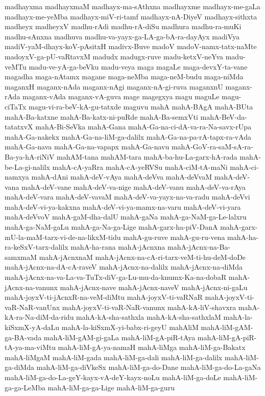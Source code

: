 {madhayxma
madhayxmaM
madhayx-ma-sAthxna
madhayxme
madhayx-me-gaLa
madhayx-me-yeMba
madhayx-miV-ri-tamf
madhayx-nA-DiyeV
madhayx-sithxta
madheyx
madheyxV
madhu-rAdi
madhu-rA-diSu
madhura
madhu-ra-muKi
madhu-sAnxna
madhuva
madhu-va-yayx-ga-LA-ga-bA-ra-dayAyx
madiVya
madiV-yaM-dhayx-koV-pAsitxH
madivx-Buve
madoV
madoV-namx-tatx-naMte
madoyxV-ga-pU-vaRtavxM
madudx
madugx-ruve
madu-ketxV-neYva
madu-veMTu
madu-ve-yA-ga-beVku
madu-veya
maga
magaLe
maga-devxY-ta-vane
magadha
maga-nAtamx
magane
maga-neMba
maga-neM-budu
maga-niMda
maganxH
maganx-nAda
maganx-nAgi
maganx-nA-gi-ruva
maganxnU
maganx-rAda
maganx-vAda
maganx-vA-guva
mage
magegxya
magu
maguLe
magu-ciTaTx
magu-vi-ra-beV-kA-gu-tatxde
maguvu
mahA
mahA-BAgA
mahA-BUta
mahA-Ba-katxne
mahA-Ba-katx-ni-puRde
mahA-Ba-semxVti
mahA-BeV-da-tatatxvX
mahA-Bi-SeVka
mahA-Gana
mahA-Ga-na-ci-dA-va-ra-Na-savx-rUpa
mahA-Ga-nakekx
mahA-Ga-na-liM-ga-dalilx
mahA-Ga-na-pa-rA-tapx-ra-vAda
mahA-Ga-nava
mahA-Ga-na-vapapx
mahA-Ga-navu
mahA-GoV-ra-saM-sA-ra-Ba-ya-hA-riNiV
mahAM-tana
mahAM-tara
mahA-ba-hu-La-garx-hA-rada
mahA-be-La-gi-nalilx
mahA-cA-yaRra
mahA-cA-yeRVSu
mahA-ciM-tA-maNi
mahA-ci-namxya
mahA-dAni
mahA-deV-vAya
mahA-deVva
mahA-deVvaM
mahA-deV-vana
mahA-deV-vane
mahA-deV-va-nige
mahA-deV-vanu
mahA-deV-va-rAya
mahA-deV-vara
mahA-deV-vavaM
mahA-deV-va-yayx-na-va-radu
mahA-deVvi
mahA-deV-vi-ya-kakxna
mahA-deV-vi-ya-mamx-na-varu
mahA-deV-vi-yara
mahA-deVvoV
mahA-gaM-dha-dalU
mahA-gaNa
mahA-ga-NaM-ga-Le-lalxru
mahA-ga-NaM-gaLu
mahA-ga-Na-ga-Lige
mahA-garx-ha-piV-DanA
mahA-garx-mU-la-maM-tarx-vi-de-na-likxM-tidu
mahA-gu-ruve
mahA-gu-ru-vena
mahA-ha-ra-keSxV-tarx-dalilx
mahA-ha-rana
mahA-jAcnxna
mahA-jAcnx-na-Ba-samxmaM
mahA-jAcnxnaM
mahA-jAcnx-na-cA-ri-tarx-veM-ti-hu-deM-doDe
mahA-jAcnx-na-dA-cA-raveV
mahA-jAcnx-na-dalilx
mahA-jAcnx-na-diMda
mahA-jAcnx-na-va-La-va-TuTx-diV-ga-Lu-mu-da-knumx-Ka-na-dobaR
mahA-jAcnx-na-vanunx
mahA-jAcnx-nave
mahA-jAcnx-naveV
mahA-jAcnx-ni-gaLu
mahA-joyxV-ti-jAcnxR-na-veM-diMtu
mahA-joyxV-ti-vaRNaR
mahA-joyxV-ti-vaR-NaR-vanUnx
mahA-joyxV-ti-vaR-NaR-vanunx
mahA-kA-liV-shavxra
mahA-kA-ra-Na-diM-da-ridu
mahA-kA-sha-sathxla
mahA-kA-sha-sathxlaM
mahA-la-kiSxmX-yA-daLu
mahA-la-kiSxmX-yi-babx-ri-geyU
mahAliM
mahA-liM-gAM-ga-BA-vada
mahA-liM-gAM-gi-gaLa
mahA-liM-gA-piR-tAya
mahA-liM-gA-piR-tA-ya-ma-viMtu
mahA-liM-gA-ya-namaH
mahA-liMga
mahA-liM-ga-Bakatx
mahA-liMgaM
mahA-liM-gada
mahA-liM-ga-dali
mahA-liM-ga-dalilx
mahA-liM-ga-diMda
mahA-liM-ga-diVkeSx
mahA-liM-ga-do-Dane
mahA-liM-ga-do-La-gaNa
mahA-liM-ga-do-La-geY-kayx-vA-deY-kayx-noLu
mahA-liM-ga-doLe
mahA-liM-ga-ga-LeMba
mahA-liM-ga-ga-Lige
mahA-liM-ga-guru
}
